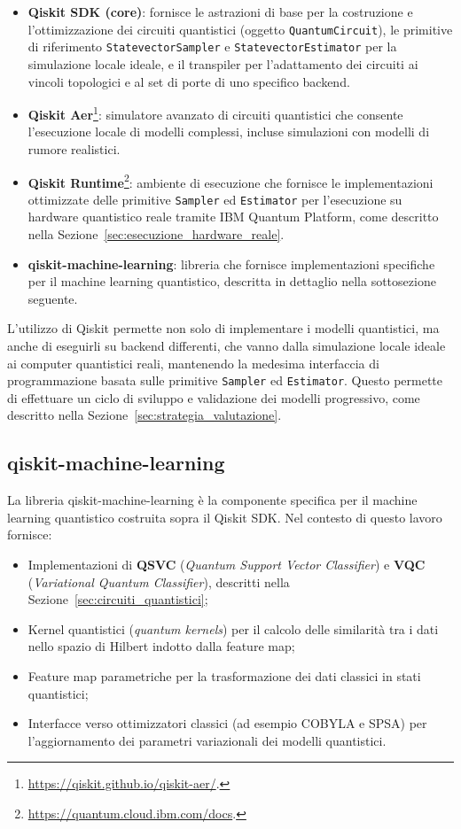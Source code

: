 \begin{itemize}
    \item \textbf{Qiskit SDK (core)}: fornisce le astrazioni di base per la costruzione e l'ottimizzazione dei circuiti quantistici (oggetto \texttt{QuantumCircuit}), le primitive di riferimento \texttt{StatevectorSampler} e \texttt{StatevectorEstimator} per la simulazione locale ideale, e il transpiler per l'adattamento dei circuiti ai vincoli topologici e al set di porte di uno specifico backend.
    \item \textbf{Qiskit Aer}\footnote{\url{https://qiskit.github.io/qiskit-aer/}.}: simulatore avanzato di circuiti quantistici che consente l'esecuzione locale di modelli complessi, incluse simulazioni con modelli di rumore realistici.
    \item \textbf{Qiskit Runtime}\footnote{\url{https://quantum.cloud.ibm.com/docs}.}: ambiente di esecuzione che fornisce le implementazioni ottimizzate delle primitive \texttt{Sampler} ed \texttt{Estimator} per l'esecuzione su hardware quantistico reale tramite IBM Quantum Platform, come descritto nella Sezione~\ref{sec:esecuzione_hardware_reale}.
    \item \textbf{qiskit-machine-learning}: libreria che fornisce implementazioni specifiche per il machine learning quantistico, descritta in dettaglio nella sottosezione seguente.
\end{itemize}

L'utilizzo di Qiskit permette non solo di implementare i modelli quantistici, ma anche di eseguirli su backend differenti, che vanno dalla simulazione locale ideale ai computer quantistici reali, mantenendo la medesima interfaccia di programmazione basata sulle primitive \texttt{Sampler} ed \texttt{Estimator}. Questo permette di effettuare un ciclo di sviluppo e validazione dei modelli progressivo, come descritto nella Sezione~\ref{sec:strategia_valutazione}.

\subsection{qiskit-machine-learning}
\label{sec:qiskit_machine_learning}
La libreria qiskit-machine-learning è la componente specifica per il machine learning quantistico costruita sopra il Qiskit SDK. Nel contesto di questo lavoro fornisce:
\begin{itemize}
    \item Implementazioni di \textbf{QSVC} (\textit{Quantum Support Vector Classifier}) e \textbf{VQC} (\textit{Variational Quantum Classifier}), descritti nella Sezione~\ref{sec:circuiti_quantistici};
    \item Kernel quantistici (\textit{quantum kernels}) per il calcolo delle similarità tra i dati nello spazio di Hilbert indotto dalla feature map;
    \item Feature map parametriche per la trasformazione dei dati classici in stati quantistici;
    \item Interfacce verso ottimizzatori classici (ad esempio COBYLA e SPSA) per l'aggiornamento dei parametri variazionali dei modelli quantistici.
\end{itemize}

